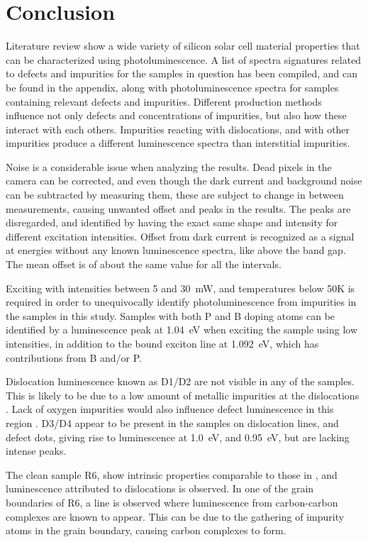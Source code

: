 \section{Conclusion}

Literature review show a wide variety of silicon solar cell material properties that can be characterized using photoluminescence. A list of spectra signatures related to defects and impurities for the samples in question has been compiled, and can be found in the appendix, along with photoluminescence spectra for samples containing relevant defects and impurities. Different production methods influence not only defects and concentrations of impurities, but also how these interact with each others. Impurities reacting with dislocations, and with other impurities produce a different luminescence spectra than interstitial impurities.


Noise is a considerable issue when analyzing the results. Dead pixels in the camera can be corrected, and even though the dark current and background noise can be subtracted by measuring them, these are subject to change in between measurements, causing unwanted offset and peaks in the results. The peaks are disregarded, and identified by having the exact same shape and intensity for different excitation intensities. Offset from dark current is recognized as a signal at energies without any known luminescence spectra, like above the band gap. The mean offset is of about the same value for all the intervals.

Exciting with intensities between 5 and 30~mW, and temperatures below 50K is required in order to unequivocally identify photoluminescence from impurities in the samples in this study. Samples with both P and B doping atoms can be identified by a luminescence peak at 1.04~eV when exciting the sample using low intensities, in addition to the bound exciton line at 1.092~eV, which has contributions from B and/or P. 


Dislocation luminescence known as D1/D2 are not visible in any of the samples. This is likely to be due to a low amount of metallic impurities at the dislocations \cite{arguirov07}. Lack of oxygen impurities would also influence defect luminescence in this region \cite{inoue07}. D3/D4 appear to be present in the samples on dislocation lines, and defect dots, giving rise to luminescence at 1.0~eV, and 0.95~eV, but are lacking intense peaks.

The clean sample R6, show intrinsic properties comparable to those in \cite{dean67}, and luminescence attributed to dislocations is observed. In one of the grain boundaries of R6, a line is observed where luminescence from carbon-carbon complexes are known to appear. This can be due to the gathering of impurity atoms in the grain boundary, causing carbon complexes to form.

